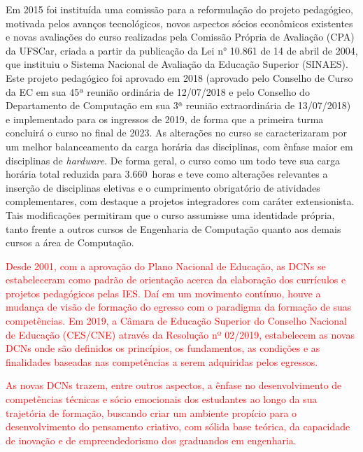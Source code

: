Em 2015 foi instituída uma comissão para a reformulação do projeto pedagógico, motivada pelos avanços tecnológicos, novos aspectos sócios econômicos existentes e novas avaliações do curso realizadas pela Comissão Própria de Avaliação (CPA) da UFSCar, criada a partir da publicação da Lei n° 10.861 de 14 de abril de 2004, que instituiu o Sistema Nacional de Avaliação da Educação Superior (SINAES). Este projeto pedagógico foi aprovado em 2018 (aprovado pelo Conselho de Curso da EC em sua 45ª reunião ordinária de 12/07/2018 e pelo Conselho do Departamento de Computação em sua 3ª reunião extraordinária de 13/07/2018) e implementado para os ingressos de 2019, de forma que a primeira turma concluirá o curso no final de 2023. As alterações no curso se caracterizaram por um melhor balanceamento da carga horária das disciplinas, com ênfase maior em disciplinas de \textit{hardware}. De forma geral, o curso como um todo teve sua carga horária total reduzida para 3.660~horas e teve como alterações relevantes a inserção de disciplinas eletivas e o cumprimento obrigatório de atividades complementares, com destaque a projetos integradores com caráter extensionista. Tais modificações permitiram que o curso assumisse uma identidade própria, tanto frente a outros cursos de Engenharia de Computação quanto aos demais cursos a área de Computação. 


\textcolor{red}{Desde 2001, com a aprovação do Plano Nacional de Educação, as DCNs se estabeleceram como padrão de orientação acerca da elaboração dos currículos e projetos pedagógicos pelas IES. Daí em um movimento contínuo, houve a mudança de visão de formação do egresso com o paradigma da formação de suas competências. Em 2019, a Câmara de Educação Superior do Conselho Nacional de Educação (CES/CNE) através da Resolução nº 02/2019, estabelecem as novas DCNs onde são definidos os princípios, os fundamentos, as condições e as finalidades baseadas nas competências a serem adquiridas pelos egressos.}  

\textcolor{red}{As novas DCNs trazem, entre outros aspectos, a ênfase no desenvolvimento de competências técnicas e sócio emocionais dos estudantes ao longo da sua trajetória de formação, buscando criar um ambiente propício para o desenvolvimento do pensamento criativo, com sólida base teórica, da capacidade de inovação e de empreendedorismo dos graduandos em engenharia.}

